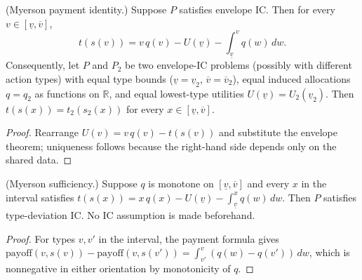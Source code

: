 \begin{theorem}\label{thm:MathEconLib.SingleParameterProblem.payment_identity}\leanok
{}
(Myerson payment identity.) Suppose $P$ satisfies envelope IC. Then for every $v\in[\underline v,\overline v]$,
\[
t(s(v))=v\,q(v)-U(\underline v)-\int_{\underline v}^{v}q(w)\,dw .
\]
Consequently, let $P$ and $P_2$ be two envelope-IC problems (possibly with different action types) with equal type bounds ($\underline v=\underline v_2$, $\overline v=\overline v_2$), equal induced allocations $q=q_2$ as functions on $\mathbb{R}$, and equal lowest-type utilities $U(\underline v)=U_2(\underline v_2)$. Then $t(s(x))=t_2(s_2(x))$ for every $x\in[\underline v,\overline v]$.
\end{theorem}
\begin{proof}\leanok
{}
Rearrange $U(v)=v\,q(v)-t(s(v))$ and substitute the envelope theorem; uniqueness follows because the right-hand side depends only on the shared data.
\end{proof}

\begin{theorem}\label{thm:MathEconLib.SingleParameterProblem.typeDeviationIC_of_monotone_q}\leanok
{}
(Myerson sufficiency.) Suppose $q$ is monotone on $[\underline v,\overline v]$ and every $x$ in the interval satisfies $t(s(x))=x\,q(x)-U(\underline v)-\int_{\underline v}^{x}q(w)\,dw$. Then $P$ satisfies type-deviation IC. No IC assumption is made beforehand.
\end{theorem}
\begin{proof}\leanok
For types $v,v'$ in the interval, the payment formula gives $\mathrm{payoff}(v,s(v))-\mathrm{payoff}(v,s(v'))=\int_{v'}^{v}(q(w)-q(v'))\,dw$, which is nonnegative in either orientation by monotonicity of $q$.
\end{proof}

